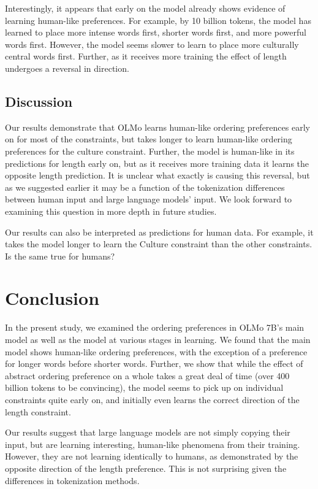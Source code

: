 \documentclass[
  nottoc]{article}
\begin{document}
Interestingly, it appears that early on the model already shows evidence
of learning human-like preferences. For example, by 10 billion tokens,
the model has learned to place more intense words first, shorter words
first, and more powerful words first. However, the model seems slower to
learn to place more culturally central words first. Further, as it
receives more training the effect of length undergoes a reversal in
direction.

\subsection{Discussion}\label{discussion-1}

Our results demonstrate that OLMo learns human-like ordering preferences
early on for most of the constraints, but takes longer to learn
human-like ordering preferences for the culture constraint. Further, the
model is human-like in its predictions for length early on, but as it
receives more training data it learns the opposite length prediction. It
is unclear what exactly is causing this reversal, but as we suggested
earlier it may be a function of the tokenization differences between
human input and large language models' input. We look forward to
examining this question in more depth in future studies.

Our results can also be interpreted as predictions for human data. For
example, it takes the model longer to learn the Culture constraint than
the other constraints. Is the same true for humans?

\section{Conclusion}\label{conclusion}

In the present study, we examined the ordering preferences in OLMo 7B's
main model as well as the model at various stages in learning. We found
that the main model shows human-like ordering preferences, with the
exception of a preference for longer words before shorter words.
Further, we show that while the effect of abstract ordering preference
on a whole takes a great deal of time (over 400 billion tokens to be
convincing), the model seems to pick up on individual constraints quite
early on, and initially even learns the correct direction of the length
constraint.

Our results suggest that large language models are not simply copying
their input, but are learning interesting, human-like phenomena from
their training. However, they are not learning identically to humans, as
demonstrated by the opposite direction of the length preference. This is
not surprising given the differences in tokenization methods.
\end{document}
